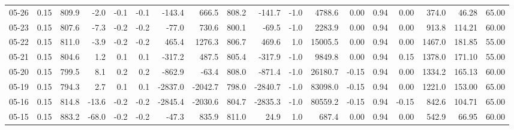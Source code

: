 \begin{threeparttable}
{\begin{tabular}{lrrrrrrrrrrrrrrrrr}
  05-26 &     0.15 & 809.9 &              -2.0 &              -0.1 &               -0.1 &             -143.4 &   666.5 & 808.2 &     -141.7 &                     -1.0 &              4788.6 &       0.00 &      0.94 &           0.00 &            374.0 &           46.28 &                  65.00 \\
  05-23 &     0.15 & 807.6 &              -7.3 &              -0.2 &               -0.2 &              -77.0 &   730.6 & 800.1 &      -69.5 &                     -1.0 &              2283.9 &       0.00 &      0.94 &           0.00 &            913.8 &          114.21 &                  60.00 \\
  05-22 &     0.15 & 811.0 &              -3.9 &              -0.2 &               -0.2 &              465.4 &  1276.3 & 806.7 &      469.6 &                      1.0 &             15005.5 &       0.00 &      0.94 &           0.00 &           1467.0 &          181.85 &                  55.00 \\
  05-21 &     0.15 & 804.6 &               1.2 &               0.1 &                0.1 &             -317.2 &   487.5 & 805.4 &     -317.9 &                     -1.0 &              9849.8 &       0.00 &      0.94 &           0.15 &           1378.0 &          171.10 &                  55.00 \\
  05-20 &     0.15 & 799.5 &               8.1 &               0.2 &                0.2 &             -862.9 &   -63.4 & 808.0 &     -871.4 &                     -1.0 &             26180.7 &      -0.15 &      0.94 &           0.00 &           1334.2 &          165.13 &                  60.00 \\
  05-19 &     0.15 & 794.3 &               2.7 &               0.1 &                0.1 &            -2837.0 & -2042.7 & 798.0 &    -2840.7 &                     -1.0 &             83098.0 &      -0.15 &      0.94 &           0.00 &           1221.0 &          153.00 &                  65.00 \\
  05-16 &     0.15 & 814.8 &             -13.6 &              -0.2 &               -0.2 &            -2845.4 & -2030.6 & 804.7 &    -2835.3 &                     -1.0 &             80559.2 &      -0.15 &      0.94 &          -0.15 &            842.6 &          104.71 &                  65.00 \\
  05-15 &     0.15 & 883.2 &             -68.0 &              -0.2 &               -0.2 &              -47.3 &   835.9 & 811.0 &       24.9 &                      1.0 &               687.4 &       0.00 &      0.94 &           0.00 &            542.9 &           66.95 &                  60.00 \\

\end{tabular}}
\end{threeparttable}

